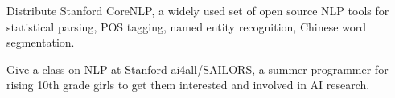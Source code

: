 \documentclass[11pt,letterpaper]{article}
\begin{document}
\begin{vita}
\begin{Synergistic Activities}
\item Distribute Stanford CoreNLP, a widely used set of open source NLP tools for statistical parsing,
POS tagging, named entity recognition, Chinese word segmentation.

\item Give a class on NLP at Stanford ai4all/SAILORS, a summer programmer for rising 10th grade girls to get them 
interested and involved in AI research.




\end{Synergistic Activities}


\vspace*{24pt}

\vfill
\end{vita}
\end{document}
